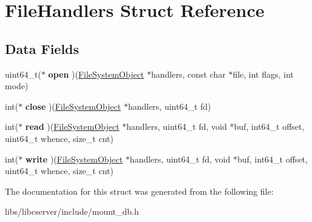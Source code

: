 \hypertarget{structFileHandlers}{}\section{File\+Handlers Struct Reference}
\label{structFileHandlers}
\subsection*{Data Fields}
\begin{DoxyCompactItemize}
\item 
uint64\+\_\+t($\ast$ {\bfseries open} )(\hyperlink{structFileSystemObject}{File\+System\+Object} $\ast$handlers, const char $\ast$file, int flags, int mode)\hypertarget{structFileHandlers_ace75f4785056149290e384e116e1d1b7}{}\label{structFileHandlers_ace75f4785056149290e384e116e1d1b7}

\item 
int($\ast$ {\bfseries close} )(\hyperlink{structFileSystemObject}{File\+System\+Object} $\ast$handlers, uint64\+\_\+t fd)\hypertarget{structFileHandlers_a5d08b1252e8f3428181989c2b3a272f7}{}\label{structFileHandlers_a5d08b1252e8f3428181989c2b3a272f7}

\item 
int($\ast$ {\bfseries read} )(\hyperlink{structFileSystemObject}{File\+System\+Object} $\ast$handlers, uint64\+\_\+t fd, void $\ast$buf, int64\+\_\+t offset, uint64\+\_\+t whence, size\+\_\+t cnt)\hypertarget{structFileHandlers_aa5d17c7742c2216783e445f29389ff31}{}\label{structFileHandlers_aa5d17c7742c2216783e445f29389ff31}

\item 
int($\ast$ {\bfseries write} )(\hyperlink{structFileSystemObject}{File\+System\+Object} $\ast$handlers, uint64\+\_\+t fd, void $\ast$buf, int64\+\_\+t offset, uint64\+\_\+t whence, size\+\_\+t cnt)\hypertarget{structFileHandlers_a8940db20920d98067acfecc072f50887}{}\label{structFileHandlers_a8940db20920d98067acfecc072f50887}

\end{DoxyCompactItemize}


The documentation for this struct was generated from the following file\+:\begin{DoxyCompactItemize}
\item 
libs/libcserver/include/mount\+\_\+db.\+h\end{DoxyCompactItemize}
